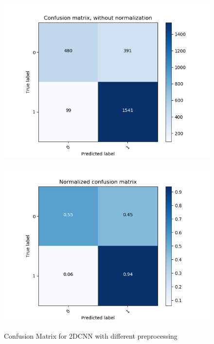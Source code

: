 \begin{figure}
\begin{minipage}[b]{0.45\columnwidth}
		\includegraphics[clip, width=\linewidth]{fig/chapter4/3d/confusion_matrix/count_confusion_matrix_False_100_gru}
		\label{fig: count_pretrain_preprocess}
	\end{minipage}
	\begin{minipage}[b]{0.45\columnwidth}
		\centering
		\includegraphics[clip, width=\linewidth]{fig/chapter4/3d/confusion_matrix/normalized_confusion_matrix_False_100_gru}
		\label{fig: pretrain_preprocess}
	\end{minipage}
	
	
	\caption{Confusion Matrix for 2DCNN with different preprocessing}
	\label{fig:gru_matrix}
	
\end{figure}

